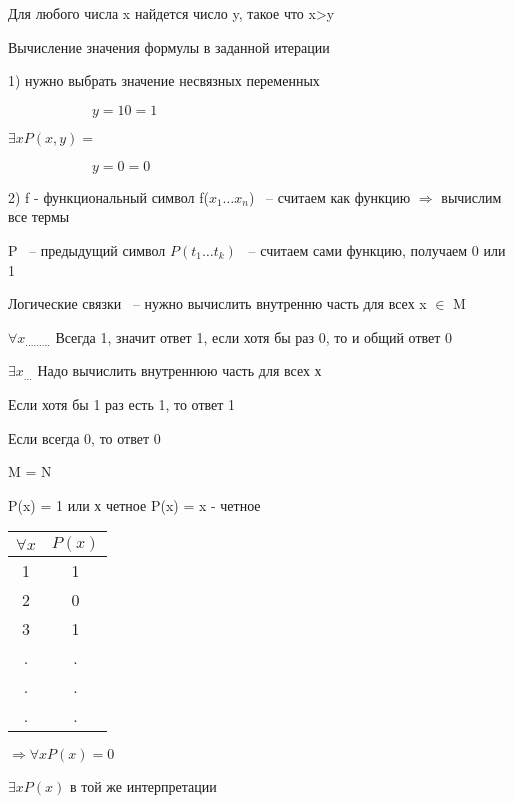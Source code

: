 \documentclass[russian]{lecture-notes}
\begin{document}
    Для любого числа x найдется число y, такое что x>y

    Вычисление значения формулы в заданной итерации

    1) нужно выбрать значение несвязных переменных

    $\qquad \qquad \qquad y = 10 = 1$

    $\exists x P(x,y) = $

    $\qquad \qquad \qquad y = 0 = 0$

    2) f - функциональный символ f($x_{1} \dots x_{n}$) ~-- считаем как функцию $\Rightarrow$ вычислим все термы

    P ~-- предыдущий символ $P(t_{1} \dots t_{k})$ ~-- считаем сами функцию, получаем 0 или 1

    Логические связки ~-- нужно вычислить внутренню часть для всех x $\in $ M

    $\forall x_{ \dots \dots \dots }$ Всегда 1, значит ответ 1, если хотя бы раз 0, то и общий ответ 0

    $\exists x_{ \dots }$ Надо вычислить внутреннюю часть для всех х

    Если хотя бы 1 раз есть 1, то ответ 1

    Если всегда 0, то ответ 0

    M = N

    P(x) = 1 или х четное \qquad \qquad P(x) = x - четное

    \begin{table}[h!]
                \centering
                \begin{tabular}{|c|c|}
                    \hline
                    $\forall x$ & $P(x)$ \\ \hline
                    1      & 1       \\ \hline
                    2      & 0       \\ \hline
                    3      & 1       \\ \hline
                    .      & .       \\ \hline
                    .      & .       \\ \hline
                    .      & .       \\ \hline
                \end{tabular}
            \end{table}

    $\Rightarrow \forall x P(x) = 0$

    $\exists x P(x)$ в той же интерпретации
\end{document}
